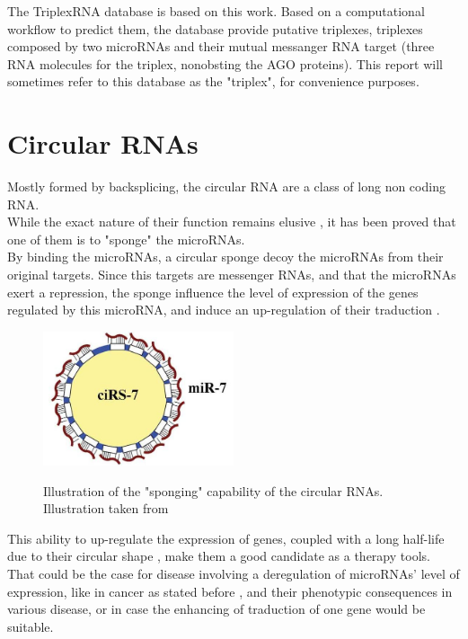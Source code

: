 \documentclass[a4paper,12pt]{report}
\begin{document}
The TriplexRNA database is based on this work. Based on a computational workflow to predict them\cite{triplex}, the database provide putative triplexes, triplexes composed by two microRNAs and their mutual messanger RNA target (three RNA molecules for the triplex, nonobsting the AGO proteins). This report will sometimes refer to this database as the "triplex", for convenience purposes.



\section{Circular RNAs}

Mostly formed by backsplicing\cite{diversity, sponge}, the circular RNA are a class of long non coding RNA.\\
While the exact nature of their function remains elusive \cite{diversity, mir7, sponge}, it has been proved that one of them is to "sponge" the microRNAs\cite{mir7,sponge}. \\
By binding the microRNAs, a circular sponge decoy the microRNAs from their original targets. Since this targets are messenger RNAs, and that the microRNAs exert a repression, the sponge influence the level of expression of the genes regulated by this microRNA, and induce an up-regulation of their traduction \cite{mir7,carcinoma,sponge}.

\begin{figure}[H]
	\centering
	{\includegraphics[width=0.5\textwidth]{sponge.jpg}}
	\caption{Illustration of the "sponging" capability of the circular RNAs. Illustration taken from\cite{sponge}}
\end{figure}

This ability to up-regulate the expression of genes, coupled with a long half-life due to their circular shape \cite{sponge}, make them a good candidate as a therapy tools. \\

That could be the case for disease involving a deregulation of microRNAs' level of expression, like in cancer as stated before \cite{cancer}, and their phenotypic consequences in various disease\cite{therapeutics}, or in case the enhancing of traduction of one gene would be suitable.
\end{document}
